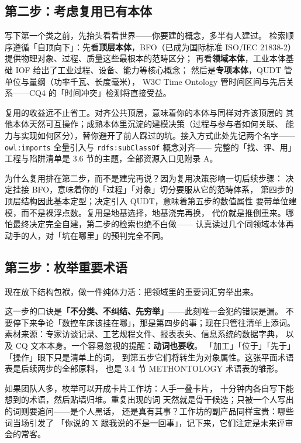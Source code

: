 \subsection{第二步：考虑复用已有本体}

写下第一个类之前，先抬头看看世界——你要建的概念，多半有人建过。
检索顺序遵循「自顶向下」：先看\textbf{顶层本体}，BFO（已成为国际标准
ISO/IEC 21838-2）提供物理对象、过程、质量这些最根本的范畴区分；
再看\textbf{领域本体}，工业本体基础 IOF 给出了工业过程、设备、能力等核心概念；
然后是\textbf{专项本体}，QUDT 管单位与量纲（功率千瓦、长度毫米），
W3C Time Ontology 管时间区间与先后关系——CQ4 的「时间冲突」检测将直接受益。

复用的收益远不止省工。对齐公共顶层，意味着你的本体与同样对齐该顶层的
其他本体天然可互操作；成熟本体里沉淀的建模决策（过程与参与者如何关联、
能力与实现如何区分），替你避开了前人踩过的坑。接入方式此处先记两个名字——
\texttt{owl:imports} 全量引入与 \texttt{rdfs:subClassOf} 概念对齐——
完整的「找、评、用」工程与陷阱清单是 3.6 节的主题，全部资源入口见附录 A。

为什么复用排在第二步，而不是建完再说？因为复用决策影响一切后续步骤：
决定挂接 BFO，意味着你的「过程」「对象」切分要服从它的范畴体系，
第四步的顶层结构因此基本定型；决定引入 QUDT，意味着第五步的数值属性
要带单位建模，而不是裸浮点数。复用是地基选择，地基浇完再换，
代价就是推倒重来。哪怕最终决定完全自建，第二步的检索也绝不白做——
认真读过几个同领域本体再动手的人，对「坑在哪里」的预判完全不同。

\subsection{第三步：枚举重要术语}

现在放下结构包袱，做一件纯体力活：把领域里的重要词汇穷举出来。



这一步的口诀是\textbf{「不分类、不纠结、先穷举」}——此刻唯一会犯的错误是漏。
不要停下来争论「数控车床该挂在哪」，那是第四步的事；现在只管往清单上添词。
素材来源：专家访谈记录、工艺规程文件、报表表头、信息系统的数据字典，
以及 CQ 文本本身。一个容易忽视的提醒：\textbf{动词也要收}。
「加工」「位于」「先于」「操作」眼下只是清单上的词，
到第五步它们将转生为对象属性。这张平面术语表是后续两步的全部原料，
也是 3.4 节 METHONTOLOGY 术语表的雏形。

如果团队人多，枚举可以开成卡片工作坊：人手一叠卡片，
十分钟内各自写下能想到的术语，然后贴墙归堆。重复出现的词
天然就是骨干候选；只被一个人写出的词则要追问——是个人黑话，
还是真有其事？工作坊的副产品同样宝贵：哪些词当场引发了
「你说的 X 跟我说的不是一回事」，记下来，它们注定是未来评审会的常客。

